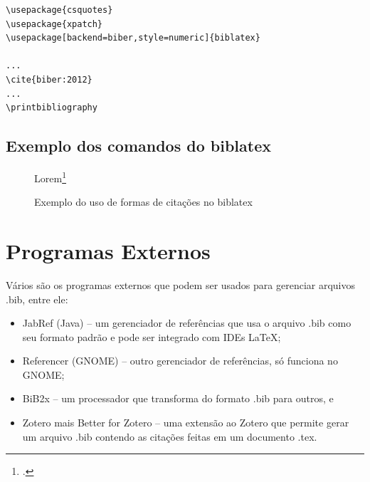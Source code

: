 \begin{lstlisting}[caption=Exemplo de uso de biblatex,label=list:bib1]
\usepackage{csquotes}
\usepackage{xpatch}
\usepackage[backend=biber,style=numeric]{biblatex}

...
\cite{biber:2012}
...
\printbibliography
\end{lstlisting}



\subsection{Exemplo dos comandos do biblatex}
\begin{figure}[hbt]
\centering
\begin{LTXexample}[pos=b]

\autocite{biber:2012}

\cite{biber:2012}

\parencite{biber:2012}

\textcite{biber:2012}

Lorem\footcite{biber:2012}

\end{LTXexample}
\caption{Exemplo do uso de formas de citações no biblatex}
\label{fig:cite}
\end{figure}





\section{Programas Externos}

Vários são os programas externos que podem ser usados
para gerenciar arquivos .bib, entre ele:

\begin{itemize}
    \item JabRef (Java) -- um gerenciador de referências que usa o arquivo .bib como seu formato padrão e pode ser integrado com IDEs \LaTeX;
    \item Referencer (GNOME) -- outro gerenciador de referências, só funciona no GNOME;
    \item BiB2x  -- um processador que transforma do formato .bib para outros, e
    \item Zotero mais Better  for Zotero -- uma extensão ao Zotero que permite gerar um arquivo .bib contendo as citações feitas em um documento .tex.
\end{itemize}


